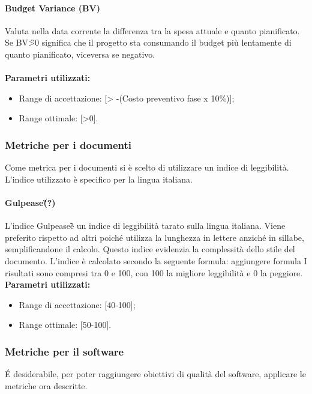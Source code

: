 \paragraph{Budget Variance (BV)}
Valuta nella data corrente la differenza tra la spesa attuale e quanto pianificato.\newline
Se BV\G>0 significa che il progetto sta consumando il budget più lentamente di 
quanto pianificato, viceversa se negativo.\\\\
\textbf{Parametri utilizzati:}

\begin{itemize}
	\item Range di accettazione: [> -(Costo preventivo fase x 10\%)];
	\item Range ottimale: [>0].
\end{itemize}

\subsubsection{Metriche per i documenti}
Come metrica per i documenti si è scelto di utilizzare un indice di 
leggibilità. L'indice utilizzato è specifico per la lingua italiana.

\paragraph{Gulpease\G (?)}
L'indice Gulpease\G è un indice di leggibilità tarato sulla lingua italiana. 
Viene preferito rispetto ad altri poiché utilizza la lunghezza in lettere 
anziché in sillabe, semplificandone il calcolo. Questo indice evidenzia la 
complessità dello stile del documento.\newline
L'indice è calcolato secondo la seguente formula: \newline \newline
{aggiungere formula} \newline \newline
I risultati sono compresi tra 0 e 100, con 100 la migliore leggibilità e 0 la peggiore. \textbf{Parametri utilizzati:}
\begin{itemize}
	\item Range di accettazione: [40-100];
	\item Range ottimale: [50-100].
\end{itemize}

\subsubsection{Metriche per il software}
\'E desiderabile, per poter raggiungere obiettivi di qualità del software, 
applicare le metriche ora descritte.


